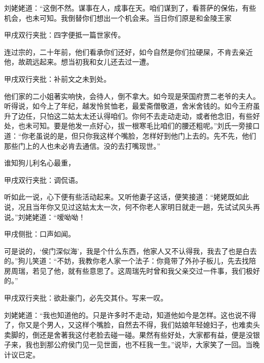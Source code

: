 \begin{parag}
    刘姥姥道：“这倒不然。谋事在人，成事在天。咱们谋到了，看菩萨的保佑，有些机会，也未可知。我倒替你们想出一个机会来。当日你们原是和金陵王家\begin{note}甲戌双行夹批：四字便抵一篇世家传。\end{note}连过宗的，二十年前，他们看承你们还好，如今自然是你们拉硬屎，不肯去亲近他，故疏远起来。想当初我和女儿还去过一遭。\begin{note}甲戌双行夹批：补前文之未到处。\end{note}他们家的二小姐著实响快，会待人，倒不拿大。如今现是荣国府贾二老爷的夫人。听得说，如今上了年纪，越发怜贫恤老，最爱斋僧敬道，舍米舍钱的。如今王府虽升了边任，只怕这二姑太太还认得咱们。你何不去走动走动，或者他念旧，有些好处，也未可知。要是他发一点好心，拔一根寒毛比咱们的腰还粗呢。”刘氏一旁接口道：“你老虽说的是，但只你我这样个嘴脸，怎样好到他门上去的。先不先，他们那些门上的人也未必肯去通信。没的去打嘴现世。”
\end{parag}


\begin{parag}
    谁知狗儿利名心最重，\begin{note}甲戌双行夹批：调侃语。\end{note}听如此一说，心下便有些活动起来。又听他妻子这话，便笑接道：“姥姥既如此说，况且当年你又见过这姑太太一次，何不你老人家明日就走一趟，先试试风头再说。”刘姥姥道：“嗳呦呦！\begin{note}甲戌侧批：口声如闻。\end{note}可是说的，‘侯门深似海’，我是个什么东西，他家人又不认得我，我去了也是白去的。”狗儿笑道：“不妨，我教你老人家一个法子：你竟带了外孙子板儿，先去找陪房周瑞，若见了他，就有些意思了。这周瑞先时曾和我父亲交过一件事，我们极好的。”\begin{note}甲戌双行夹批：欲赴豪门，必先交其仆。写来一叹。\end{note}刘姥姥道：“我也知道他的。只是许多时不走动，知道他如今是怎样。这也说不得了，你又是个男人，又这样个嘴脸，自然去不得，我们姑娘年轻媳妇子，也难卖头卖脚的，倒还是舍著我这付老脸去碰一碰。果然有些好处，大家都有益，便是没银子来，我也到那公府侯门见一见世面，也不枉我一生。”说毕，大家笑了一回。当晚计议已定。
\end{parag}


